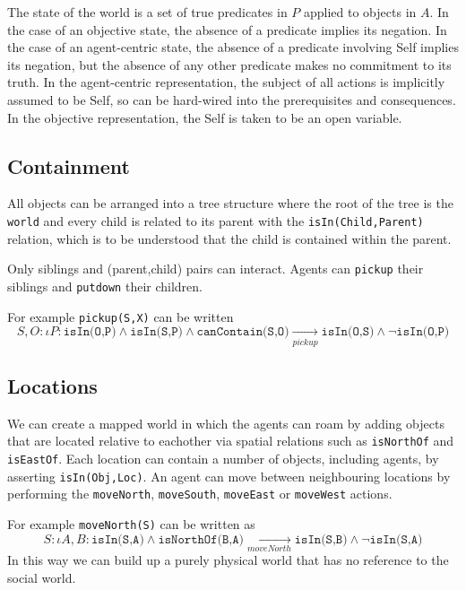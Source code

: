 \documentclass[a4paper]{article}
\begin{document}
The state of the world is a set of true predicates in $P$ applied to objects in $A$. In the case of an objective state, the absence of a predicate implies its negation. In the case of an agent-centric state, the absence of a predicate involving Self implies its negation, but the absence of any other predicate makes no commitment to its truth. In the agent-centric representation, the subject of all actions is implicitly assumed to be Self, so can be hard-wired into the prerequisites and consequences. In the objective representation, the Self is taken to be an open variable.

\subsection{Containment}

All objects can be arranged into a tree structure where the root of the tree is the \texttt{world} and every child is related to its parent with the \texttt{isIn(Child,Parent)} relation, which is to be understood that the child is contained within the parent.

Only siblings and (parent,child) pairs can interact. Agents can \texttt{pickup} their siblings and \texttt{putdown} their children.

For example \texttt{pickup(S,X)} can be written
\begin{dmath}
S,O: \iota P: \texttt{isIn(O,P)} \wedge \texttt{isIn(S,P)} \wedge \texttt{canContain(S,O)} 
\underset{pickup}{\to}
\texttt{isIn(O,S)} \wedge \neg \texttt{isIn(O,P)}
\end{dmath}

\subsection{Locations}

We can create a mapped world in which the agents can roam by adding objects that are located relative to eachother via spatial relations such as \texttt{isNorthOf} and \texttt{isEastOf}. Each location can contain a number of objects, including agents, by asserting \texttt{isIn(Obj,Loc)}. An agent can move between neighbouring locations by performing the \texttt{moveNorth}, \texttt{moveSouth}, \texttt{moveEast} or \texttt{moveWest} actions.

For example \texttt{moveNorth(S)} can be written as
\[
S:\iota A,B: \texttt{isIn(S,A)} \wedge \texttt{isNorthOf(B,A)} \underset{moveNorth}{\to} \texttt{isIn(S,B)} \wedge \neg \texttt{isIn(S,A)}
\]
In this way we can build up a purely physical world that has no reference to the social world.
\end{document}
